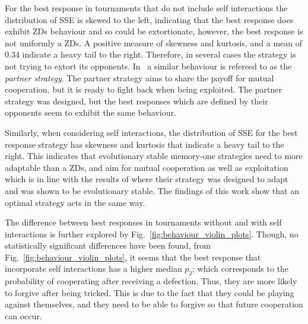 \documentclass[10pt]{article}
\begin{document}
For the best response in tournaments that do not include self interactions the
distribution of SSE is skewed to the left, indicating that the best response
does exhibit ZDs behaviour and so could be extortionate, however, the best
response is not uniformly a ZDs. A positive measure of skewness and kurtosis,
and a mean of 0.34 indicate a heavy tail to the right. Therefore, in several
cases the strategy is not trying to extort its opponents.
In~\cite{Hilbe2018} a similar behaviour is refereed to as the \textit{partner
strategy}. The partner
strategy aims to share the payoff for mutual cooperation, but it is ready
to fight back when being exploited. The partner strategy was designed, but the
best responses which are defined by their opponents seem to exhibit the same
behaviour.

Similarly, when considering self interactions, the distribution of SSE for the best
response strategy has skewness and kurtosis that indicate a heavy tail to the
right. This indicates that evolutionary stable memory-one strategies need to
more adaptable than a ZDs, and aim for mutual cooperation as well as
exploitation which is in line with the results of \cite{Hilbe2018} where their
strategy was designed to adapt and was shown to be evolutionary stable. The
findings of this work show that an optimal strategy acts in the same way.

The difference between best responses in tournaments without and with self interactions
is further explored by Fig.~\ref{fig:behaviour_violin_plots}.
Though, no statistically significant differences have been found, from
Fig.~\ref{fig:behaviour_violin_plots}, it seems that the best
response that incorporate self interactions has a higher median $p_2$; which corresponds to the probability of cooperating
after receiving a defection. Thus, they are more likely to forgive after
being tricked. This is due to the fact that they could be playing against
themselves, and they need to be able to forgive so that future cooperation can
occur.
\end{document}
